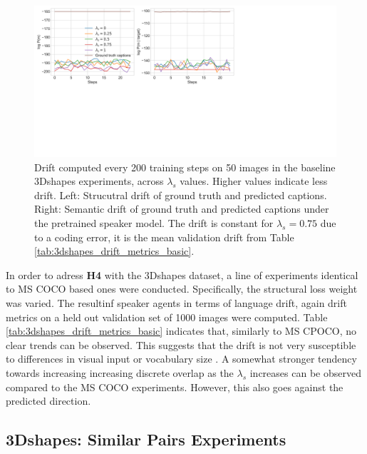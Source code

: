 \begin{figure}
	\centering
	\includegraphics[width=\linewidth]{images/shapes_structural_semantic_drift_49_pure_L_s_all_random.png}
	\caption{Drift computed every 200 training steps on 50 images in the baseline 3Dshapes experiments, across $\lambda_s$ values. Higher values indicate less drift. Left: Strucutral drift of ground truth and predicted captions. Right: Semantic drift of ground truth and predicted captions under the pretrained speaker model. The drift is constant for $\lambda_s = 0.75$ due to a coding error, it is the mean validation drift from Table \ref{tab:3dshapes_drift_metrics_basic}.} 
	\label{fig:3dshapes_baseline_all_str_sem_drift}
\end{figure}

In order to adress \textbf{H4} with the 3Dshapes dataset, a line of experiments identical to MS COCO based ones were conducted. Specifically, the structural loss weight was varied. The resultinf speaker agents in terms of language drift, again drift metrics on a held out validation set of 1000 images were computed. Table \ref{tab:3dshapes_drift_metrics_basic} indicates that, similarly to MS CPOCO, no clear trends can be observed. This suggests that the drift is not very susceptible to differences in visual input or vocabulary size . A somewhat stronger tendency towards increasing increasing discrete overlap as the $\lambda_s$ increases can be observed compared to the MS COCO experiments. However, this also goes against the predicted direction. 



\subsection{3Dshapes: Similar Pairs Experiments}
\label{expt:3dsapes_similar}

